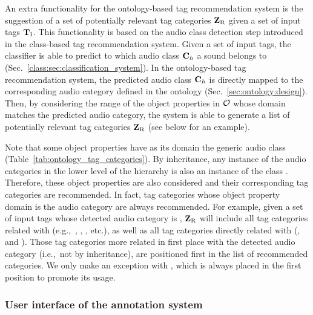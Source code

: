 An extra functionality for the ontology-based tag recommendation system is the suggestion of a set of potentially relevant tag categories $\mathbf{Z}_\text{R}$ given a set of input tags $\mathbf{T}_{\text{I}}$. 
This functionality is based on the audio class detection step introduced in the class-based tag recommendation system. 
Given a set of input tags, the classifier is able to predict to which audio class $\mathbf{C}_{h}$ a sound belongs to (Sec.~\ref{class:sec:classification_system}).
In the ontology-based tag recommendation system, the predicted audio class $\mathbf{C}_{h}$ is directly mapped to the corresponding audio category defined in the ontology (Sec.~\ref{sec:ontology:design}). Then, by considering the range of the object properties in $\mathcal{O}$ whose domain matches the predicted audio category, the system is able to generate a list of potentially relevant tag categories $\mathbf{Z}_\text{R}$ (see below for an example). 

Note that some object properties have as its domain the generic audio class  (Table~\ref{tab:ontology_tag_categories}). By inheritance, any instance of the audio categories in the lower level of the hierarchy is also an instance of the class . Therefore, these object properties are also considered and their corresponding tag categories are recommended. In fact, tag categories whose object property domain is the audio category  are always recommended.
For example, given a set of input tags whose detected audio category is , $\mathbf{Z}_\text{R}$ will include all tag categories related with  (e.g.,~, , , etc.), as well as all tag categories directly related with  (,  and ).
Those tag categories more related in first place with the detected audio category (i.e.,~not by inheritance), are positioned first in the list of recommended categories. We only make an exception with , which is always placed in the first position to promote its usage.


\subsubsection{User interface of the annotation system}

